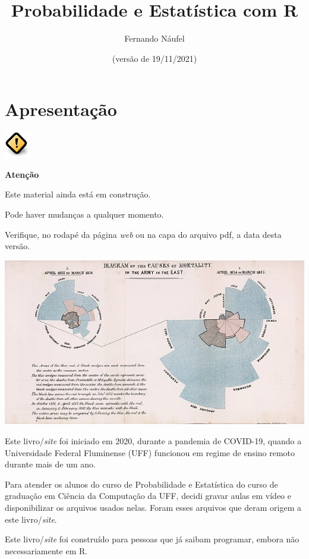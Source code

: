 \documentclass[
  11pt]{report}
\title{Probabilidade e Estatística com R}
\author{Fernando Náufel}
\date{(versão de 19/11/2021)}
\newenvironment{rmdcaution}
{
  \begin{mycaution}
    \includegraphics{images/caution.png}
    \tcblower
  }
  {
  \end{mycaution}
}
\begin{document}
\maketitle

{
\setcounter{tocdepth}{1}
\tableofcontents
}
\hypertarget{apresentacao}{%
\chapter*{Apresentação}\label{apresentacao}}

\begin{rmdcaution}
\textbf{Atenção}

Este material ainda está em construção.

Pode haver mudanças a qualquer momento.

Verifique, no rodapé da página \emph{web} ou na capa do arquivo pdf, a data desta versão.

\end{rmdcaution}

\newpage

\includegraphics{images/640px-Nightingale-mortality.jpg}

\vspace{2cm}

Este livro/\emph{site} foi iniciado em 2020, durante a pandemia de COVID-19, quando a Universidade Federal Fluminense (UFF) funcionou em regime de ensino remoto durante mais de um ano.

Para atender os alunos do curso de Probabilidade e Estatística do curso de graduação em Ciência da Computação da UFF, decidi gravar aulas em vídeo e disponibilizar os arquivos usados nelas. Foram esses arquivos que deram origem a este livro/\emph{site}.

Este livro/\emph{site} foi construído para pessoas que já saibam programar, embora não necessariamente em R.
\end{document}
